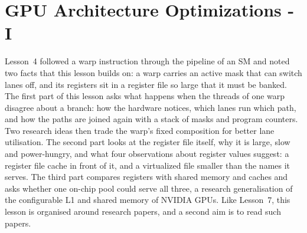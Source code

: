 \documentclass[../main.tex]{subfiles}
\begin{document}
\chapter{GPU Architecture Optimizations - I}

Lesson~4 followed a warp instruction through the pipeline of an SM and
noted two facts that this lesson builds on: a warp carries an active
mask that can switch lanes off, and its registers sit in a register file
so large that it must be banked.  The first part of this lesson asks
what happens when the threads of one warp disagree about a branch: how
the hardware notices, which lanes run which path, and how the paths are
joined again with a stack of masks and program counters.  Two research
ideas then trade the warp's fixed composition for better lane
utilisation.  The second part looks at the register file itself, why it
is large, slow and power-hungry, and what four observations about
register values suggest: a register file cache in front of it, and a
virtualized file smaller than the names it serves.  The third part
compares registers with shared memory and caches and asks whether one
on-chip pool could serve all three, a research generalisation of the
configurable L1 and shared memory of NVIDIA GPUs.  Like Lesson~7, this
lesson is organised around research papers, and a second aim is to read
such papers.
\end{document}
